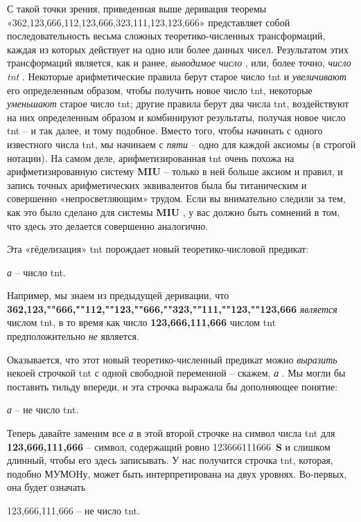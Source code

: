 \documentclass[../main.tex]{subfiles}
\begin{document}
С такой точки зрения, приведенная выше деривация теоремы «362,123,666,112,123,666,323,111,123,123,666» представляет собой последовательность весьма сложных теоретико-численных трансформаций, каждая из которых действует на одно или более данных чисел. Результатом этих трансформаций является, как и ранее, \emph{выводимое число} , или, более точно, \emph{число \acs{tnt}} . Некоторые арифметические правила берут старое число \acs{tnt} и \emph{увеличивают} его определенным образом, чтобы получить новое число \acs{tnt}, некоторые \emph{уменьшают} старое число \acs{tnt}; другие правила берут два числа \acs{tnt}, воздействуют на них определенным образом и комбинируют результаты, получая новое число \acs{tnt} \--- и так далее, и тому подобное. Вместо того, чтобы начинать с одного известного числа \acs{tnt}, мы начинаем с \emph{пяти} \--- одно для каждой аксиомы (в строгой нотации). На самом деле, арифметизированная \acs{tnt} очень похожа на арифметизированную систему \textbf{MIU} \--- только в ней больше аксиом и правил, и запись точных арифметических эквивалентов была бы титаническим и совершенно «непросветляющим» трудом. Если вы внимательно следили за тем, как это было сделано для системы \textbf{MIU} , у вас должно быть сомнений в том, что здесь это делается совершенно аналогично.

Эта «гёделизация» \acs{tnt} порождает новый теоретико-числовой предикат:

\emph{а} \--- число \acs{tnt}.

Например, мы знаем из предыдущей деривации, что \textbf{362,123,""666,""112,""123,""666,""323,""111,""123,""123,666} \emph{является} числом \acs{tnt}, в то время как число \textbf{123,666,111,666} числом \acs{tnt} предположительно \emph{не} является.

Оказывается, что этот новый теоретико-численный предикат можно \emph{выразить} некоей строчкой \acs{tnt} с одной свободной переменной \--- скажем, \emph{а} . Мы могли бы поставить тильду впереди, и эта строчка выражала бы дополняющее понятие:

\emph{а} \--- не число \acs{tnt}.

Теперь давайте заменим все \emph{а} в этой второй строчке на символ числа \acs{tnt} для \textbf{123,666,111,666} \--- символ, содержащий ровно \num{123 666 111 666}~\textbf{S} и слишком длинный, чтобы его здесь записывать. У нас получится строчка \acs{tnt}, которая, подобно МУМОНу, может быть интерпретирована на двух уровнях. Во-первых, она будет означать

123,666,111,666 \--- не число \acs{tnt}.
\end{document}
